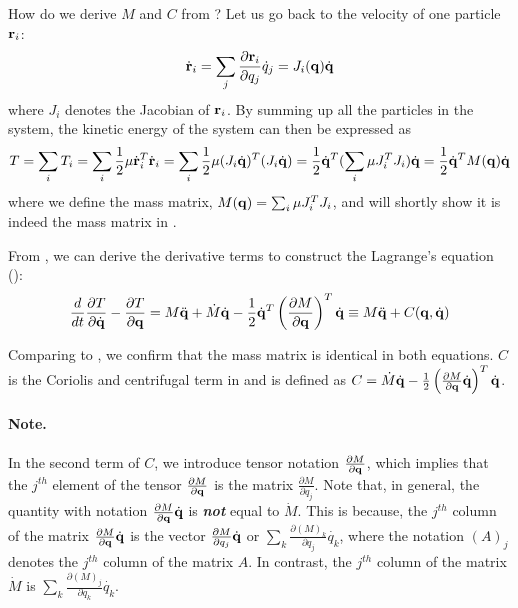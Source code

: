 How do we derive $M$ and $C$ from ?
Let us go back to the velocity of one particle $\mathbf{r}_i$:
\begin{equation}
\dot{\mathbf{r}}_i = \sum_j \frac{\partial
  \mathbf{r}_i}{\partial q_j} \dot{q}_j = J_i(\mathbf{q}) \dot{\mathbf{q}}
\end{equation}
where $J_i$ denotes the Jacobian of $\mathbf{r}_i$. By summing up
all the particles in the system, the kinetic
energy of the system can then be expressed as
\begin{equation}
\label{eq:kinetic_vector}
T = \sum_i T_i = \sum_i \frac{1}{2}  \mathbf{\mu} \dot{\mathbf{r}}_i^{T}
    \dot{\mathbf{r}}_i = \sum_i \frac{1}{2}  \mathbf{\mu} (J_i
    \dot{\mathbf{q}})^T(J_i \dot{\mathbf{q}}) = \frac{1}{2} \dot{\mathbf{q}}^T
    (\sum_i \mathbf{\mu} J_i^TJ_i) \dot{\mathbf{q}} = \frac{1}{2}
    \dot{\mathbf{q}}^T M(\mathbf{q}) \dot{\mathbf{q}}
\end{equation}
where we define the mass matrix, $M(\mathbf{q}) = \sum_i \mathbf{\mu}
J_i^TJ_i$, and will shortly show it is indeed the mass matrix in
.

From , we can derive the derivative
terms to construct the Lagrange's equation ():
\begin{equation}
\label{eq:lagrangian_vector2}
\frac{d}{dt}\frac{\partial T}{\partial \dot{\mathbf{q}}} - \frac{\partial
  T}{\partial \mathbf{q}} = M\ddot{\mathbf{q}} + \dot{M} \dot{\mathbf{q}} - \frac{1}{2}\dot{\mathbf{q}}^T \left ( \frac{\partial M}{\partial \mathbf{q}} \right )^T \dot{\mathbf{q}} \equiv M
\ddot{\mathbf{q}} + C(\mathbf{q}, \dot{\mathbf{q}})
\end{equation}

Comparing  to ,
we confirm that the mass matrix is identical in both equations. $C$ is
the Coriolis and centrifugal term in  and is
defined as $C = \dot{M} \dot{\mathbf{q}} - \frac{1}{2}\left( \frac{\partial M}{\partial  \mathbf{q}} \dot{\mathbf{q}} \right)^T \dot{\mathbf{q}}$. 

\paragraph{Note.} In the second term of $C$, we introduce tensor notation $\frac{\partial M}{\partial \mathbf{q}}$, which implies that the $j^{th}$ element of the tensor $\frac{\partial M}{\partial \mathbf{q}}$ is the matrix $\frac{\partial M}{\partial {q}_j}$. Note that, in general, the quantity with notation $\frac{\partial M}{\partial \mathbf{q}} \dot{\mathbf{q}}$ is \textbf{\emph{not}} equal to $\dot{M}$. This is because, the $j^{th}$ column of the matrix $\frac{\partial M}{\partial \mathbf{q}} \dot{\mathbf{q}}$ is the vector $\frac{\partial M}{\partial q_j} \dot{\mathbf{q}}$ or $\sum_k \frac{\partial (M)_k}{\partial q_j} \dot{{q}_k}$, where the notation $(A)_j$ denotes the $j^{th}$ column of the matrix $A$. In contrast, the $j^{th}$ column of the matrix $\dot{M}$ is $\sum_k \frac{\partial (M)_j}{\partial q_k} \dot{{q}_k}$.

